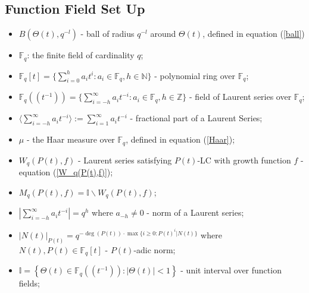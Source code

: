 \documentclass{article}
\theoremstyle{definition}
\newcommand{\N}{\mathbb{N}}
\newcommand{\F}{\mathbb{F}}
\newcommand{\I}{\mathbb{I}}
\newcommand{\Z}{\mathbb{Z}}
\numberwithin{equation}{subsection}
\begin{document}
\subsection*{Function Field Set Up}
\begin{itemize}
    \item $B(\Theta(t),q^{-l})$ - ball of radius $q^{-l}$ around $\Theta(t)$, defined in equation (\ref{ball})
    \item $\F_q$: the finite field of cardinality $q$;
    \item $\F_q[t]=\{\sum_{i=0}^h a_it^i: a_i\in\F_q, h\in\N\}$ - polynomial ring over $\F_q$;
    \item $\F_q\!\left(\!\left(t^{-1}\right)\!\right)=\{\sum_{i=-h}^\infty a_it^{-i}: a_i\in\F_q, h\in\Z\}$ - field of Laurent series over $\F_q$;
    \item $\langle \sum_{i=-h}^\infty a_it^{-i}\rangle:=\sum_{i=1}^\infty a_it^{-i}$ - fractional part of a Laurent Series;
    \item $\mu$ - the Haar measure over $\F_q$, defined in equation (\ref{Haar});
    \item $W_q(P(t),f)$ - Laurent series satisfying $P(t)$-LC with growth function $f$ - equation (\ref{W_q(P(t),f)}); 
    \item $M_q(P(t),f)=\I\backslash W_q(P(t),f)$;
    \item $|\sum_{i=-h}^\infty a_i t^{-i}|=q^{h}$ where $a_{-h}\neq0$ - norm of a Laurent series;
    \item $|N(t)|_{P(t)}=q^{-\deg(P(t))\cdot \max\{i\ge0:P(t)^i|N(t)\}}$ where $N(t),P(t)\in\F_q[t]$ - $P(t)$-adic norm;
    \item $\I=\left\{\Theta(t)\in{\F_q}\left(\!\left(t^{-1}\right)\!\right): |\Theta(t)|<1\right\}$ - unit interval over function fields;

\end{itemize}
\end{document}
